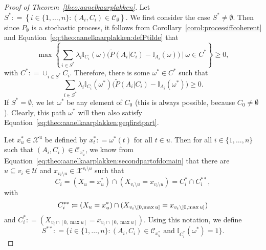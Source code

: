 \documentclass[10pt]{paper}
\theoremstyle{definition}
\newcommand{\states}{\mathcal{X}}
\newcommand{\ind}[1]{\mathbb{I}_{#1}}
\newcommand{\coloneqq}{:\!=}
\begin{document}
\begin{proof}[Proof of Theorem~\ref{theo:aanelkaarplakken}]
Let $S^*\coloneqq\left\{i\in\{1,\dots,n\}\colon(A_i,C_i)\in\mathcal{C}_\emptyset\right\}$. We first consider the case $S^*\neq\emptyset$. Then since $P_\emptyset$ is a stochastic process, it follows from Corollary~\ref{corol:processiffcoherent} and Equation~\eqref{eq:theo:aanelkaarplakken:defPtilde} that
\begin{equation*}%
\max\left\{\sum_{i\in S^*}\lambda_i\ind{C_i}(\omega)\bigl(\tilde{P}(A_i\vert C_i)-\ind{A_i}(\omega)\bigr)~\Bigg\vert~\omega\in C^*\right\}\geq0,
\end{equation*}
with $C^*\coloneqq\cup_{i\in S^*}C_i$. Therefore, there is some $\omega^*\in C^*$ such that
\begin{equation}\label{eq:theo:aanelkaarplakken:geqfirstpart}
\sum_{i\in S^*}\lambda_i\ind{C_i}(\omega^*)\bigl(\tilde{P}(A_i\vert C_i)-\ind{A_i}(\omega^*)\bigr)\geq0.
\end{equation}
If $S^*=\emptyset$, we let $\omega^*$ be any element of $C_0$ (this is always possible, because $C_0\neq\emptyset$). Clearly, this path $\omega^*$ will then also satisfy Equation~\eqref{eq:theo:aanelkaarplakken:geqfirstpart}.


Let $x_u^*\in\states^u$ be defined by $x_t^*\coloneqq \omega^*(t)$ for all $t\in u$.
Then for all $i\in\{1,\dots,n\}$ such that $(A_i,C_i)\in\mathcal{C}_{x_u^*}$, we know from Equation~\eqref{eq:theo:aanelkaarplakken:secondpartofdomain} that there are $u\subseteq v_i\in\mathcal{U}$ and $x_{v_i\setminus u}\in\states^{v_i\setminus u}$ such that
\begin{equation}\label{eq:theo:aanelkaarplakken:Cisplit}
C_i=(X_u=x_u^*)\cap(X_{v_i\setminus u}=x_{v_i\setminus u})=C_i^*\cap C_i^{**},
\end{equation}
with 
\begin{equation}\label{eq:theo:aanelkaarplakken:Cistarstar}
C_i^{**}\coloneqq(X_u=x_u^*)\cap(X_{v_i\setminus [0,\max u]}=x_{v_i\setminus [0,\max u]})\vspace{2mm}
\end{equation}
and $C_i^{*}\coloneqq(X_{v_i\cap [0,\max u]}=x_{v_i\cap [0,\max u]})$. Using this notation, we define
\begin{equation}\label{eq:theo:aanelkaarplakken:Sstarstardef}
S^{**}\coloneqq
\{
i\in\{1,\dots,n\}
\colon
(A_i,C_i)\in\mathcal{C}_{x_u^*}
\text{~and~}
\ind{C_i^*}(\omega^*)=1
\}.
\end{equation}



\end{proof}
\end{document}
